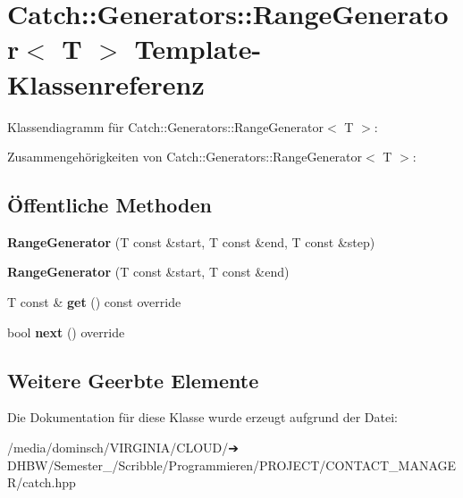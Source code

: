 \hypertarget{classCatch_1_1Generators_1_1RangeGenerator}{}\section{Catch\+:\+:Generators\+:\+:Range\+Generator$<$ T $>$ Template-\/\+Klassenreferenz}
\label{classCatch_1_1Generators_1_1RangeGenerator}


Klassendiagramm für Catch\+:\+:Generators\+:\+:Range\+Generator$<$ T $>$\+:


Zusammengehörigkeiten von Catch\+:\+:Generators\+:\+:Range\+Generator$<$ T $>$\+:
\subsection*{Öffentliche Methoden}
\begin{DoxyCompactItemize}
\item 
\mbox{\label{classCatch_1_1Generators_1_1RangeGenerator_a6a9b3cc009471c085c985642e0ab102e}} 
{\bfseries Range\+Generator} (T const \&start, T const \&end, T const \&step)
\item 
\mbox{\label{classCatch_1_1Generators_1_1RangeGenerator_ac999eb143945ff311b97d2c767df90d3}} 
{\bfseries Range\+Generator} (T const \&start, T const \&end)
\item 
\mbox{\label{classCatch_1_1Generators_1_1RangeGenerator_a2639173bb9f06ba353314cd226fcefec}} 
T const  \& {\bfseries get} () const override
\item 
\mbox{\label{classCatch_1_1Generators_1_1RangeGenerator_a4e6b2038832f09724d5a4355b4691259}} 
bool {\bfseries next} () override
\end{DoxyCompactItemize}
\subsection*{Weitere Geerbte Elemente}


Die Dokumentation für diese Klasse wurde erzeugt aufgrund der Datei\+:\begin{DoxyCompactItemize}
\item 
/media/dominsch/\+V\+I\+R\+G\+I\+N\+I\+A/\+C\+L\+O\+U\+D/➔ D\+H\+B\+W/\+Semester\+\_/\+Scribble/\+Programmieren/\+P\+R\+O\+J\+E\+C\+T/\+C\+O\+N\+T\+A\+C\+T\+\_\+\+M\+A\+N\+A\+G\+E\+R/catch.\+hpp\end{DoxyCompactItemize}
